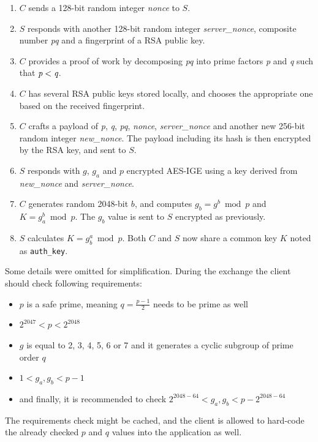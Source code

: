\documentclass[thesis=M,english]{FITthesis}[2012/10/20]
\begin{document}
\begin{enumerate}
	\item $C$ sends a 128-bit random integer \emph{nonce} to $S$.
	\item $S$ responds with another 128-bit random integer \emph{server\_nonce}, composite number \emph{pq} and a fingerprint of a RSA public key.
	\item $C$ provides a proof of work by decomposing \emph{pq} into prime factors \emph{p} and \emph{q} such that $\emph{p} < \emph{q}$.
	\item $C$ has several RSA public keys stored locally, and chooses the appropriate one based on the received fingerprint.
	\item $C$ crafts a payload of \emph{p}, \emph{q}, \emph{pq}, \emph{nonce}, \emph{server\_nonce} and another new 256-bit random integer \emph{new\_nonce}. The payload including its hash is then encrypted by the RSA key, and sent to $S$.
	\item $S$ responds with $g$, $g_a$ and $p$ encrypted AES-IGE using a key derived from \emph{new\_nonce} and \emph{server\_nonce}.\label{crypto-initialization-6}
	\item $C$ generates random 2048-bit $b$, and computes $g_b = g^b \bmod p$ and $K = g_a^b \bmod p$. The $g_b$ value is sent to $S$ encrypted as previously.
	\item $S$ calculates $K = g_b^a \bmod p$. Both $C$ and $S$ now share a common key $K$ noted as \texttt{auth\_key}.
\end{enumerate}

Some details were omitted for simplification. During the exchange the client should check following requirements:\label{crypto-prime-req}

\begin{itemize}
	\item $p$ is a safe prime, meaning $q = \frac{p-1}{2}$ needs to be prime as well
	\item $2^{2047} < p < 2^{2048}$
	\item $g$ is equal to 2, 3, 4, 5, 6 or 7 and it generates a cyclic subgroup of prime order $q$
	\item $1 < g_a, g_b < p-1$
	\item and finally, it is recommended to check $2^{2048-64} < g_a, g_b < p - 2^{2048-64}$
\end{itemize}

The requirements check might be cached, and the client is allowed to hard-code the already checked $p$ and $q$ values into the application as well.
\end{document}
